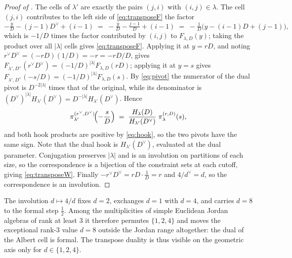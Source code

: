 \documentclass[11pt,letterpaper]{article}
\begin{document}
\begin{proof}[Proof of ]
The cells of $\lambda'$ are exactly the pairs $(j,i)$ with $(i,j)\in\lambda$. The
cell $(j,i)$ contributes to the left side of \eqref{eq:transposeF} the factor
\begin{equation*}
  -\tfrac{y}{D}-(j-1)D^{\vee}+(i-1)
  \;=\;-\tfrac{y}{D}-\tfrac{j-1}{D}+(i-1)
  \;=\;-\tfrac1D\bigl(y-(i-1)D+(j-1)\bigr),
\end{equation*}
which is $-1/D$ times the factor contributed by $(i,j)$ to $F_{\lambda,D}(y)$;
taking the product over all $|\lambda|$ cells gives \eqref{eq:transposeF}.
Applying it at $y=rD$, and noting $r^{\vee}D^{\vee}=(-rD)(1/D)=-r=-rD/D$, gives
$F_{\lambda',D^{\vee}}(r^{\vee}D^{\vee})=(-1/D)^{|\lambda|}F_{\lambda,D}(rD)$;
applying it at $y=s$ gives
$F_{\lambda',D^{\vee}}(-s/D)=(-1/D)^{|\lambda|}F_{\lambda,D}(s)$. By
\eqref{eq:pivot} the numerator of the dual pivot is $D^{-2|\lambda|}$ times that
of the original, while its denominator is
$(D^{\vee})^{|\lambda|}H_{\lambda'}(D^{\vee})=D^{-|\lambda|}H_{\lambda'}(D^{\vee})$.
Hence
\begin{equation}
  \pi^{(r^{\vee},D^{\vee})}_{\lambda'}\!\Bigl(-\frac{s}{D}\Bigr)
  \;=\;\frac{H_\lambda(D)}{H_{\lambda'}(D^{\vee})}\;\pi^{(r,D)}_{\lambda}(s),
  \label{eq:hookratio}
\end{equation}
and both hook products are positive by \eqref{eq:hook}, so the two pivots have
the same sign. Note that the dual hook is $H_{\lambda'}(D^{\vee})$, evaluated at
the dual parameter.
Conjugation preserves $|\lambda|$ and is an involution on partitions of each
size, so the correspondence is a bijection of the constraint sets at each cutoff,
giving \eqref{eq:transposeW}. Finally $-r^{\vee}D^{\vee}=rD\cdot\tfrac1D=r$
and $4/d^{\vee}=d$, so the correspondence is an involution.
\end{proof}

The involution $d\mapsto4/d$ fixes $d=2$, exchanges
$d=1$ with $d=4$, and carries $d=8$ to the formal step $\tfrac12$. Among the
multiplicities of simple Euclidean Jordan algebras of rank at least $3$ it
therefore permutes $\{1,2,4\}$ and moves the exceptional rank-$3$ value $d=8$
outside the Jordan range altogether: the dual of the Albert cell is formal. The
transpose duality is thus visible on the geometric axis only for $d\in\{1,2,4\}$.
\end{document}
